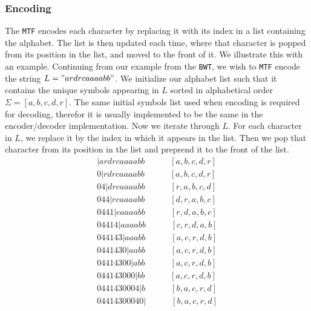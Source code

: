 \documentclass{article}
\begin{document}
\subsubsection{Encoding}
The \texttt{MTF} encodes each character by replacing it with its index in a list containing the alphabet. The list is then updated each time, where that character is popped from its position in the list, and moved to the front of it.
We illustrate this with an example. Continuing from our example from the \texttt{BWT}, we wish to \texttt{MTF} encode the string \(L = "ardrcaaaabb"\). We initialize our alphabet list such that it contains the unique symbols appearing in \(L\) sorted in alphabetical order \(\Sigma=[a, b, c, d, r]\).
The same initial symbols list used when encoding is required for decoding, therefor it is usually implemented to be the same in the encoder/decoder implementation. 
Now we iterate through \(L\). For each character in \(L\), we replace it by the index in which it appears in the list. Then we pop that character from its position in the list and preprend it to the front of the list.
{\small 
    \begin{align*}
        |ardrcaaaabb \quad \quad\quad [a, b, c, d, r] \\[-4pt]
        0|rdrcaaaabb \quad \quad\quad [a, b, c, d, r] \\[-4pt]
        04|drcaaaabb \quad \quad\quad [r, a, b, c, d] \\[-4pt]
        044|rcaaaabb \quad \quad\quad [d, r, a, b, c] \\[-4pt]
        0441|caaaabb \quad \quad\quad [r, d, a, b, c] \\[-4pt]
        04414|aaaabb \quad \quad\quad [c, r, d, a, b] \\[-4pt]
        044143|aaabb \quad \quad\quad [a, c, r, d, b] \\[-4pt]
        0441430|aabb \quad \quad\quad [a, c, r, d, b] \\[-4pt]
        04414300|abb \quad \quad\quad [a, c, r, d, b] \\[-4pt]
        044143000|bb \quad \quad\quad [a, c, r, d, b] \\[-4pt]
        0441430004|b \quad \quad\quad [b, a, c, r, d] \\[-4pt]
        04414300040| \quad \quad\quad [b, a, c, r, d]
    \end{align*}
}
\end{document}

